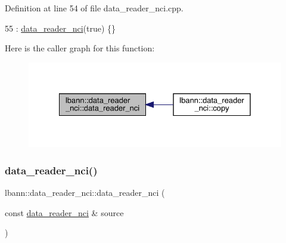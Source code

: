 Definition at line 54 of file data\+\_\+reader\+\_\+nci.\+cpp.


\begin{DoxyCode}
55   : \hyperlink{classlbann_1_1data__reader__nci_a42a40564a0110df69b99832e520111e6}{data\_reader\_nci}(\textcolor{keyword}{true}) \{\}
\end{DoxyCode}
Here is the caller graph for this function\+:\nopagebreak
\begin{figure}[H]
\begin{center}
\leavevmode
\includegraphics[width=328pt]{classlbann_1_1data__reader__nci_a42a40564a0110df69b99832e520111e6_icgraph}
\end{center}
\end{figure}
\mbox{\label{classlbann_1_1data__reader__nci_a3d2f93ffb61faabbdc7006030c518311}} 
\subsubsection{\texorpdfstring{data\+\_\+reader\+\_\+nci()}{data\_reader\_nci()}\hspace{0.1cm}{\footnotesize\ttfamily [3/3]}}
{\footnotesize\ttfamily lbann\+::data\+\_\+reader\+\_\+nci\+::data\+\_\+reader\+\_\+nci (\begin{DoxyParamCaption}\item[{const \hyperlink{classlbann_1_1data__reader__nci}{data\+\_\+reader\+\_\+nci} \&}]{source }\end{DoxyParamCaption})\hspace{0.3cm}{\ttfamily [default]}}

\mbox{\label{classlbann_1_1data__reader__nci_a5aa8e7f832ca763450027fe9886a267f}} 
